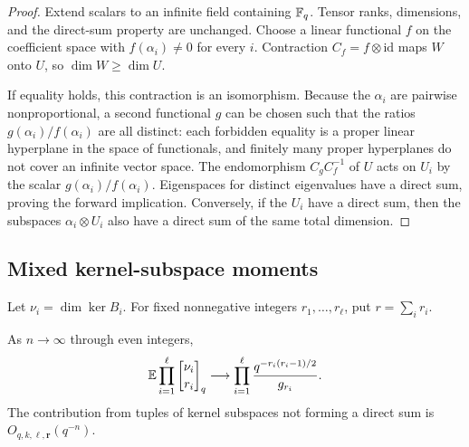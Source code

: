 \begin{proof}
Extend scalars to an infinite field containing $\mathbb F_q$. Tensor ranks,
dimensions, and the direct-sum property are unchanged. Choose a linear
functional $f$ on the coefficient space with $f(\alpha_i)\ne0$ for every
$i$. Contraction $C_f=f\otimes\mathrm{id}$ maps $W$ onto $U$, so
$\dim W\ge\dim U$.

If equality holds, this contraction is an isomorphism. Because the
$\alpha_i$ are pairwise nonproportional, a second functional $g$ can be
chosen such that the ratios $g(\alpha_i)/f(\alpha_i)$ are all distinct:
each forbidden equality is a proper linear hyperplane in the space of
functionals, and finitely many proper hyperplanes do not cover an infinite
vector space. The endomorphism $C_gC_f^{-1}$ of $U$ acts on $U_i$ by the
scalar $g(\alpha_i)/f(\alpha_i)$. Eigenspaces for distinct eigenvalues
have a direct sum, proving the forward implication. Conversely, if the
$U_i$ have a direct sum, then the subspaces $\alpha_i\otimes U_i$ also
have a direct sum of the same total dimension.
\end{proof}

\subsection{Mixed kernel-subspace moments}

Let $\nu_i=\dim\ker B_i$. For fixed nonnegative integers
$r_1,\ldots,r_\ell$, put $r=\sum_i r_i$.

\begin{lemma}
\label{lem:mixed}
As $n\to\infty$ through even integers,
\begin{equation}
 \E\prod_{i=1}^\ell\qbinom{\nu_i}{r_i}
 \longrightarrow
 \prod_{i=1}^\ell\frac{q^{-r_i(r_i-1)/2}}{g_{r_i}}.
 \label{eq:mixed-moments}
\end{equation}
The contribution from tuples of kernel subspaces not forming a direct sum
is $O_{q,k,\ell,\boldsymbol r}(q^{-n})$.
\end{lemma}

